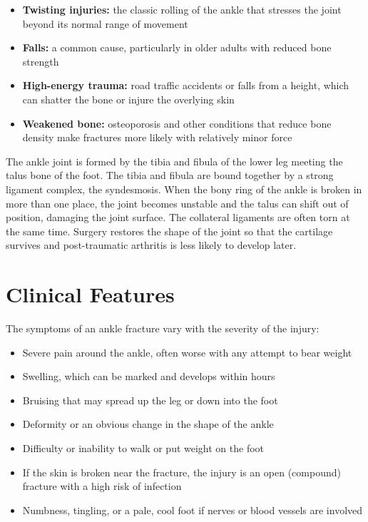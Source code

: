 \begin{itemize}
    \item \textbf{Twisting injuries:} the classic rolling of the ankle that stresses the joint beyond its normal range of movement
    \item \textbf{Falls:} a common cause, particularly in older adults with reduced bone strength
    \item \textbf{High-energy trauma:} road traffic accidents or falls from a height, which can shatter the bone or injure the overlying skin
    \item \textbf{Weakened bone:} osteoporosis and other conditions that reduce bone density make fractures more likely with relatively minor force
\end{itemize}

The ankle joint is formed by the tibia and fibula of the lower leg meeting the talus bone of the foot. The tibia and fibula are bound together by a strong ligament complex, the syndesmosis. When the bony ring of the ankle is broken in more than one place, the joint becomes unstable and the talus can shift out of position, damaging the joint surface. The collateral ligaments are often torn at the same time. Surgery restores the shape of the joint so that the cartilage survives and post-traumatic arthritis is less likely to develop later.

\section*{Clinical Features}
The symptoms of an ankle fracture vary with the severity of the injury:

\begin{itemize}
    \item Severe pain around the ankle, often worse with any attempt to bear weight
    \item Swelling, which can be marked and develops within hours
    \item Bruising that may spread up the leg or down into the foot
    \item Deformity or an obvious change in the shape of the ankle
    \item Difficulty or inability to walk or put weight on the foot
    \item If the skin is broken near the fracture, the injury is an open (compound) fracture with a high risk of infection
    \item Numbness, tingling, or a pale, cool foot if nerves or blood vessels are involved
\end{itemize}

